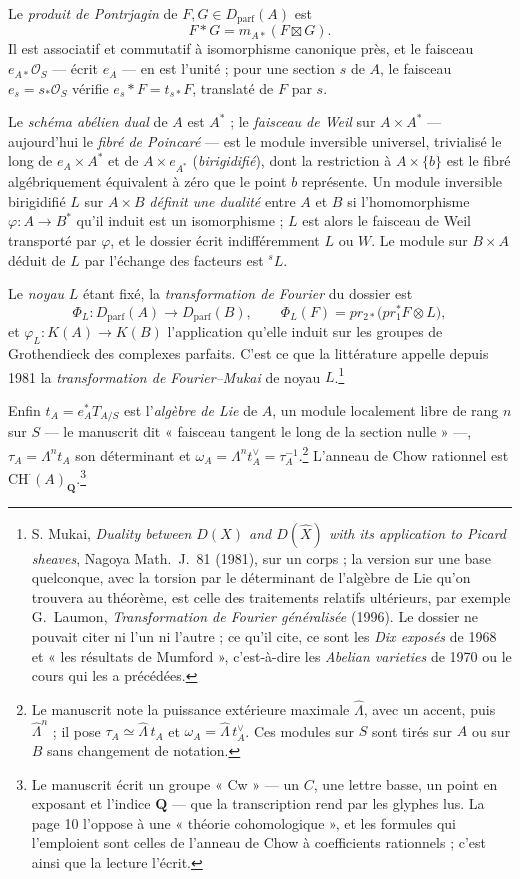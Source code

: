 \documentclass[11pt,a4paper]{article}
\begin{document}
Le \emph{produit de Pontrjagin} de $F, G \in D_{\mathrm{parf}}(A)$ est
\[
  F * G = m_{A*}(F \boxtimes G).
\]
Il est associatif et commutatif à isomorphisme canonique près, et le
faisceau $e_{A*}\mathcal{O}_S$ — écrit $e_A$ — en est l'unité ; pour une
section $s$ de $A$, le faisceau $e_s = s_{*}\mathcal{O}_S$ vérifie
$e_s * F = t_{s*}F$, translaté de $F$ par $s$.

Le \emph{schéma abélien dual} de $A$ est $A^{*}$ ; le \emph{faisceau de
Weil} sur $A \times A^{*}$ — aujourd'hui le \emph{fibré de Poincaré} — est le
module inversible universel, trivialisé le long de $e_A \times A^{*}$ et de
$A \times e_{A^{*}}$ (\emph{birigidifié}), dont la restriction à $A \times
\{b\}$ est le fibré algébriquement équivalent à zéro que le point $b$
représente. Un module inversible birigidifié $L$ sur $A \times B$
\emph{définit une dualité} entre $A$ et $B$ si l'homomorphisme
$\varphi \colon A \to B^{*}$ qu'il induit est un isomorphisme ; $L$ est alors
le faisceau de Weil transporté par $\varphi$, et le dossier écrit
indifféremment $L$ ou $W$. Le module sur $B \times A$ déduit de $L$ par
l'échange des facteurs est ${}^{s}L$.

Le \emph{noyau} $L$ étant fixé, la \emph{transformation de Fourier} du dossier
est
\[
  \Phi_L \colon D_{\mathrm{parf}}(A) \longrightarrow D_{\mathrm{parf}}(B),
  \qquad
  \Phi_L(F) = pr_{2*}\bigl(pr_1^{*}F \otimes L\bigr),
\]
et $\varphi_L \colon K(A) \to K(B)$ l'application qu'elle induit sur les
groupes de Grothendieck des complexes parfaits. C'est ce que la littérature
appelle depuis 1981 la \emph{transformation de Fourier--Mukai} de noyau
$L$.\footnote{S. Mukai, \emph{Duality between $D(X)$ and $D(\hat X)$ with its
application to Picard sheaves}, Nagoya Math.\ J.\ 81 (1981), sur un corps ;
la version sur une base quelconque, avec la torsion par le déterminant de
l'algèbre de Lie qu'on trouvera au théorème, est celle des traitements
relatifs ultérieurs, par exemple G.~Laumon, \emph{Transformation de Fourier
généralisée} (1996). Le dossier ne pouvait citer ni l'un ni l'autre ; ce
qu'il cite, ce sont les \emph{Dix exposés} de 1968 et « les résultats de
Mumford », c'est-à-dire les \emph{Abelian varieties} de 1970 ou le cours qui
les a précédées.}

Enfin $t_A = e_A^{*}T_{A/S}$ est l'\emph{algèbre de Lie} de $A$, un module
localement libre de rang $n$ sur $S$ — le manuscrit dit « faisceau tangent le
long de la section nulle » —, $\tau_A = \Lambda^{n}t_A$ son déterminant et
$\omega_A = \Lambda^{n}t_A^{\vee} = \tau_A^{-1}$.\footnote{Le manuscrit note
la puissance extérieure maximale $\hat\Lambda$, avec un accent, puis
$\hat\Lambda^{n}$ ; il pose $\tau_A \simeq \hat\Lambda\, t_A$ et
$\omega_A = \hat\Lambda\, t_A^{\vee}$. Ces modules sur $S$ sont tirés sur $A$
ou sur $B$ sans changement de notation.} L'anneau de Chow rationnel est
$\mathrm{CH}^{\cdot}(A)_{\mathbf{Q}}$.\footnote{Le manuscrit écrit un groupe
« Cw » — un $C$, une lettre basse, un point en exposant et l'indice
$\mathbf{Q}$ — que la transcription rend par les glyphes lus. La page 10
l'oppose à une « théorie cohomologique », et les formules qui l'emploient
sont celles de l'anneau de Chow à coefficients rationnels ; c'est ainsi que
la lecture l'écrit.}
\end{document}
